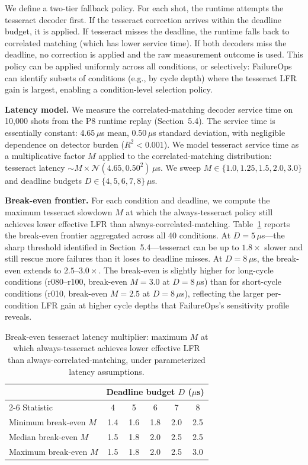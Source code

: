 We define a two-tier fallback policy. For each shot, the runtime attempts the tesseract decoder first. If the tesseract correction arrives within the deadline budget, it is applied. If tesseract misses the deadline, the runtime falls back to correlated matching (which has lower service time). If both decoders miss the deadline, no correction is applied and the raw measurement outcome is used. This policy can be applied uniformly across all conditions, or selectively: FailureOps can identify subsets of conditions (e.g., by cycle depth) where the tesseract LFR gain is largest, enabling a condition-level selection policy.

\textbf{Latency model.} We measure the correlated-matching decoder service time on 10,000 shots from the P8 runtime replay (Section~5.4). The service time is essentially constant: 4.65\,$\mu$s mean, 0.50\,$\mu$s standard deviation, with negligible dependence on detector burden ($R^2 < 0.001$). We model tesseract service time as a multiplicative factor $M$ applied to the correlated-matching distribution: tesseract latency $\sim M \times \mathcal{N}(4.65, 0.50^2)$\,$\mu$s. We sweep $M \in \{1.0, 1.25, 1.5, 2.0, 3.0\}$ and deadline budgets $D \in \{4, 5, 6, 7, 8\}$\,$\mu$s.

\textbf{Break-even frontier.} For each condition and deadline, we compute the maximum tesseract slowdown $M$ at which the always-tesseract policy still achieves lower effective LFR than always-correlated-matching. Table~\ref{tab:policy_breakeven} reports the break-even frontier aggregated across all 40 conditions. At $D = 5$\,$\mu$s---the sharp threshold identified in Section~5.4---tesseract can be up to $1.8\times$ slower and still rescue more failures than it loses to deadline misses. At $D = 8$\,$\mu$s, the break-even extends to $2.5$--$3.0\times$. The break-even is slightly higher for long-cycle conditions (r080--r100, break-even $M=3.0$ at $D=8$\,$\mu$s) than for short-cycle conditions (r010, break-even $M=2.5$ at $D=8$\,$\mu$s), reflecting the larger per-condition LFR gain at higher cycle depths that FailureOps's sensitivity profile reveals.

\begin{table}[t]
\centering
\caption{Break-even tesseract latency multiplier: maximum $M$ at which always-tesseract achieves lower effective LFR than always-correlated-matching, under parameterized latency assumptions.}
\label{tab:policy_breakeven}
\begin{tabular}{lccccc}
\toprule
& \multicolumn{5}{c}{Deadline budget $D$ ($\mu$s)} \\
\cmidrule(lr){2-6}
Statistic & 4 & 5 & 6 & 7 & 8 \\
\midrule
Minimum break-even $M$ & 1.4 & 1.6 & 1.8 & 2.0 & 2.5 \\
Median break-even $M$ & 1.5 & 1.8 & 2.0 & 2.5 & 2.5 \\
Maximum break-even $M$ & 1.5 & 1.8 & 2.0 & 2.5 & 3.0 \\
\bottomrule
\end{tabular}
\end{table}

